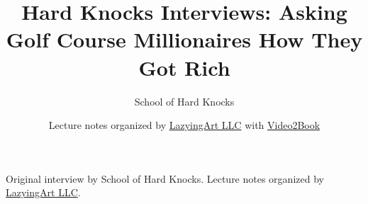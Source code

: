 \documentclass[11pt,oneside]{book}
\begin{document}
\frontmatter
\title{Hard Knocks Interviews: Asking Golf Course Millionaires How They Got Rich}
\author{School of Hard Knocks}
\date{Lecture notes organized by \href{https://lazying.art}{LazyingArt LLC} with \href{https://github.com/lachlanchen/Video2Book}{Video2Book}}
\maketitle
\begin{center}
\small Original interview by School of Hard Knocks. Lecture notes organized by \href{https://lazying.art}{LazyingArt LLC}.
\end{center}
\clearpage
\mainmatter

\end{document}
